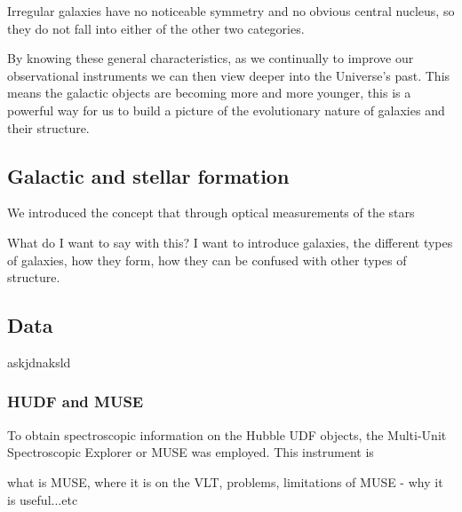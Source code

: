 \documentclass[12pt, twocolumn]{revtex4}    %
\begin{document}
Irregular galaxies have no noticeable symmetry and no obvious central nucleus, so they do not fall into either of the other two categories.


By knowing these general characteristics, as we continually to improve our observational instruments we can then view deeper into the Universe's past. This means the galactic objects are becoming more and more younger, this is a powerful way for us to build a picture of the evolutionary nature of galaxies and their structure. 

\subsection{Galactic and stellar formation}


We introduced the concept that through optical measurements of the stars 

What do I want to say with this? I want to introduce galaxies, the different types of galaxies, how they form, how they can be confused with other types of structure. 

\subsection{Data} 

askjdnaksld

\subsubsection{HUDF and MUSE}

To obtain spectroscopic information on the Hubble UDF objects, the Multi-Unit Spectroscopic Explorer or MUSE was employed. This instrument is 

what is MUSE, where it is on the VLT, problems, limitations of MUSE - why it is useful...etc
\end{document}
